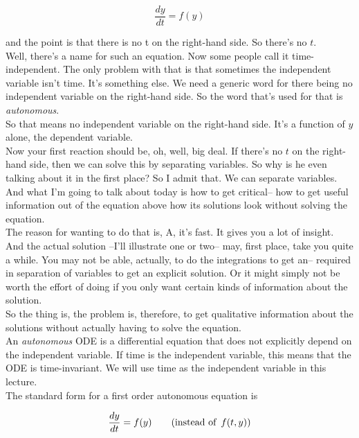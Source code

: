 \begin{equation*}
  \frac{dy}{dt} = f(y)
\end{equation*}

and the point is that there is no t on the right-hand side.
So there's no $t$.\\
Well, there's a name for such an equation.
Now some people call it time-independent.
The only problem with that is that sometimes the independent variable isn't time.
It's something else.
We need a generic word for there being no independent variable
on the right-hand side.
So the word that's used for that is \emph{autonomous}.\\
So that means no independent variable on the right-hand side.
It's a function of $y$ alone, the dependent variable.\\
Now your first reaction should be, oh, well, big deal.
If there's no $t$ on the right-hand side,
then we can solve this by separating variables.
So why is he even talking about it in the first place?
So I admit that.
We can separate variables.
And what I'm going to talk about today is how to get critical--
how to get useful information out
of the equation above how its solutions look
without solving the equation. \\
The reason for wanting to do that is, A, it's fast.
It gives you a lot of insight.
And the actual solution --I'll illustrate one or two-- may, first place,
take you quite a while.
You may not be able, actually, to do the integrations to get an--
required in separation of variables to get an explicit solution.
Or it might simply not be worth the effort
of doing if you only want certain kinds of information
about the solution.\\
So the thing is, the problem is, therefore,
to get qualitative information about the solutions without actually having to solve the equation.\\

An \emph{\color{blue}autonomous} ODE is a differential equation
that does not explicitly depend on the independent variable.
If time is the independent variable, this means that the ODE is time-invariant.
We will use time as the independent variable in this lecture.\\

The standard form for a first order autonomous equation is

\begin{equation*}
  \displaystyle  \displaystyle \frac{dy}{dt} = f(y)
  \qquad (\text {instead of }\, f(t,y))
\end{equation*}

